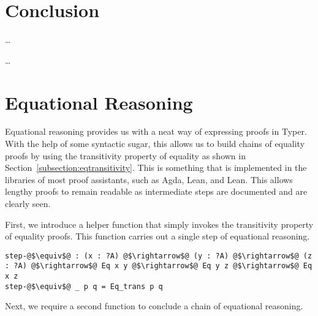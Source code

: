\documentclass[12pt,twoside,maitrise]{dms}
\theoremstyle{definition}
\numberwithin{equation}{section}
\numberwithin{table}{chapter}
\numberwithin{figure}{chapter}
\begin{document}
\chapter{Conclusion}

\ldots


\ldots





\def\bibname{References}






\anglais
\appendix

\chapter{Equational Reasoning}\label{section:eqreasoning}
Equational reasoning provides us with a neat way of expressing proofs in Typer.
With the help of some syntactic sugar, this allows us to build chains of
equality proofs by using the transitivity property of equality as shown in
Section~\ref{subsection:eqtransitivity}. This is something that is implemented
in the libraries of most proof assistants, such as Agda, Lean, and Lean. This
allows lengthy proofs to remain readable as intermediate steps are documented
and are clearly seen.

First, we introduce a helper function that simply invokes the transitivity
property of equality proofs. This function carries out a single step of
equational reasoning.

\begin{verbatim}
step-@$\equiv$@ : (x : ?A) @$\rightarrow$@ (y : ?A) @$\rightarrow$@ (z : ?A) @$\rightarrow$@ Eq x y @$\rightarrow$@ Eq y z @$\rightarrow$@ Eq x z
step-@$\equiv$@ _ p q = Eq_trans p q
\end{verbatim}

Next, we require a second function to conclude a chain of equational reasoning.
\end{document}
